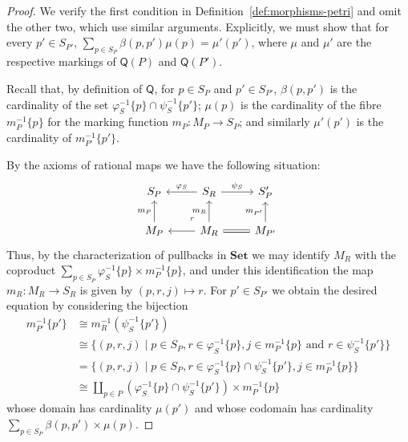 \documentclass[11pt,a4paper]{article}
\theoremstyle{plain}
\theoremstyle{definition}
\theoremstyle{remark}
\newcommand{\Q}{\mathsf{Q}}
\begin{document}
\begin{proof}
We verify the first condition in  Definition~\ref{def:morphisms-petri} and omit the other two, which use similar arguments. Explicitly, we must show that for every $p' \in S_{P'}$, $\sum_{p \in S_P} \beta(p, p')\mu(p) = \mu'(p')$, where $\mu$ and $\mu'$ are the respective markings of $\Q(P)$ and $\Q(P')$. 

Recall that, by definition of $\Q$, for $p \in S_P$ and $p' \in S_{P'}$, $\beta(p, p')$ is the cardinality of the set $\varphi_S^{-1}\{p\} \cap \psi_S^{-1}\{p'\}$; $\mu(p)$ is the cardinality of the fibre $m_P^{-1}\{ p\}$ for the marking function $m_P : M_P \to S_P$; and similarly $\mu'(p')$ is the cardinality of $m_{P'}^{-1}\{p'\}$. 

By the axioms of rational maps we have the following situation:
\[
\begin{tikzcd}
	S_P & S_R & S_P' \\
	M_P & {M_R} & {M_{P'}} 
	\arrow[from=1-2, to=1-1, "\varphi_S"']
	\arrow[from=1-2, to=1-3, "\psi_S"]
	\arrow[from=2-1, to=1-1, "m_P"]
	\arrow["\lrcorner"{anchor=center, pos=0.125, rotate=180}, draw=none, from=2-2, to=1-1]
	\arrow[from=2-2, to=1-2, "m_R"]
	\arrow[from=2-2, to=2-1]
	\arrow[equals, from=2-2, to=2-3]
	\arrow[from=2-3, to=1-3, "m_{P'}"]
\end{tikzcd}
\]
Thus, by the characterization of pullbacks in $\mathbf{Set}$ we may identify $M_R$ with the coproduct $\sum_{p \in S_P} \varphi_S^{-1}\{p\} \times m_P^{-1}\{p \}$, and under this identification the map $m_R : M_R \to S_R$ is given by $(p, r, j) \mapsto r$. For $p' \in S_{P'}$ we obtain the desired equation by considering the bijection 
\begin{align*}
m_{P'}^{-1}\{p'\} &\cong m_R^{-1} \left( \psi_S^{-1} \{ p' \} \right) \\
&\cong \{ (p, r, j) \mid  p \in S_P, r \in \varphi_S^{-1}\{p \}, j \in m_P^{-1}\{p\} \text{ and } r \in \psi_S^{-1} \{p'\} \} \\ 
&= \{ (p, r, j) \mid  p \in S_P, r \in \varphi_S^{-1}\{p \} \cap \psi_S^{-1}\{p'\}, j \in m_P^{-1}\{p\} \} \\ 
&\cong \coprod_{p \in P} \left(\varphi_S^{-1}\{p \} \cap \psi_S^{-1}\{p'\}\right) \times m_P^{-1}\{p\}
\end{align*}
whose domain has cardinality $\mu(p')$ and whose codomain has cardinality $\sum_{p \in S_P} \beta(p, p') \times \mu(p)$.





\end{proof}
\end{document}

